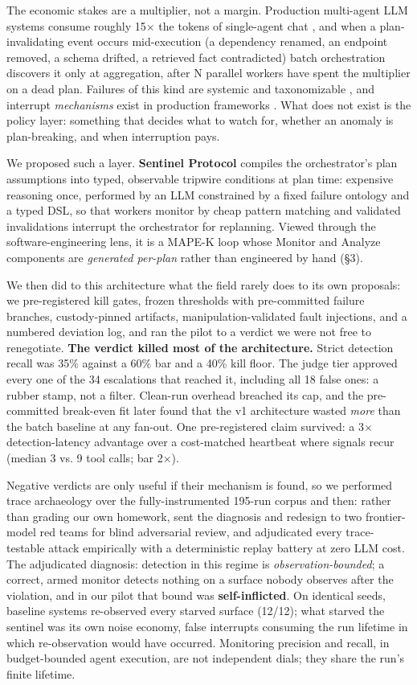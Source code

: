 \documentclass[acmsmall,screen,review,anonymous]{acmart}
\begin{document}
The economic stakes are a multiplier, not a margin. Production multi-agent LLM systems consume roughly 15$\times$ the tokens of single-agent chat \cite{ref27}, and when a plan-invalidating event occurs mid-execution (a dependency renamed, an endpoint removed, a schema drifted, a retrieved fact contradicted) batch orchestration discovers it only at aggregation, after N parallel workers have spent the multiplier on a dead plan. Failures of this kind are systemic and taxonomizable \cite{ref14, ref16}, and interrupt \emph{mechanisms} exist in production frameworks \cite{ref22}. What does not exist is the policy layer: something that decides what to watch for, whether an anomaly is plan-breaking, and when interruption pays.

We proposed such a layer. \textbf{Sentinel Protocol} compiles the orchestrator's plan assumptions into typed, observable tripwire conditions at plan time: expensive reasoning once, performed by an LLM constrained by a fixed failure ontology and a typed DSL, so that workers monitor by cheap pattern matching and validated invalidations interrupt the orchestrator for replanning. Viewed through the software-engineering lens, it is a MAPE-K loop \cite{ref23} whose Monitor and Analyze components are \emph{generated per-plan} rather than engineered by hand (\S3).

We then did to this architecture what the field rarely does to its own proposals: we pre-registered kill gates, frozen thresholds with pre-committed failure branches, custody-pinned artifacts, manipulation-validated fault injections, and a numbered deviation log, and ran the pilot to a verdict we were not free to renegotiate. \textbf{The verdict killed most of the architecture.} Strict detection recall was 35\% against a 60\% bar and a 40\% kill floor. The judge tier approved every one of the 34 escalations that reached it, including all 18 false ones: a rubber stamp, not a filter. Clean-run overhead breached its cap, and the pre-committed break-even fit later found that the v1 architecture wasted \emph{more} than the batch baseline at any fan-out. One pre-registered claim survived: a 3$\times$ detection-latency advantage over a cost-matched heartbeat where signals recur (median 3 vs. 9 tool calls; bar 2$\times$).

Negative verdicts are only useful if their mechanism is found, so we performed trace archaeology over the fully-instrumented 195-run corpus and then: rather than grading our own homework, sent the diagnosis and redesign to two frontier-model red teams for blind adversarial review, and adjudicated every trace-testable attack empirically with a deterministic replay battery at zero LLM cost. The adjudicated diagnosis: detection in this regime is \emph{observation-bounded}; a correct, armed monitor detects nothing on a surface nobody observes after the violation, and in our pilot that bound was \textbf{self-inflicted}. On identical seeds, baseline systems re-observed every starved surface (12/12); what starved the sentinel was its own noise economy, false interrupts consuming the run lifetime in which re-observation would have occurred. Monitoring precision and recall, in budget-bounded agent execution, are not independent dials; they share the run's finite lifetime.
\end{document}
